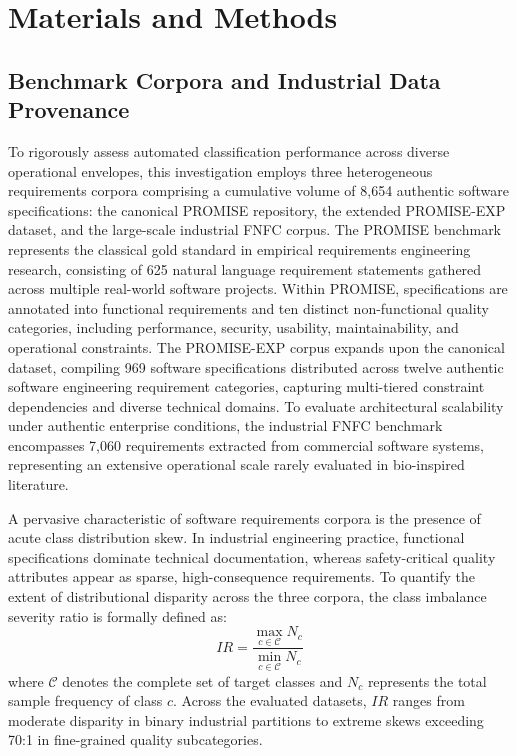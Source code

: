 \section{Materials and Methods}

\subsection{Benchmark Corpora and Industrial Data Provenance}
To rigorously assess automated classification performance across diverse operational envelopes, this investigation employs three heterogeneous requirements corpora comprising a cumulative volume of 8,654 authentic software specifications: the canonical PROMISE repository, the extended PROMISE-EXP dataset, and the large-scale industrial FNFC corpus. The PROMISE benchmark represents the classical gold standard in empirical requirements engineering research, consisting of 625 natural language requirement statements gathered across multiple real-world software projects. Within PROMISE, specifications are annotated into functional requirements and ten distinct non-functional quality categories, including performance, security, usability, maintainability, and operational constraints. The PROMISE-EXP corpus expands upon the canonical dataset, compiling 969 software specifications distributed across twelve authentic software engineering requirement categories, capturing multi-tiered constraint dependencies and diverse technical domains. To evaluate architectural scalability under authentic enterprise conditions, the industrial FNFC benchmark encompasses 7,060 requirements extracted from commercial software systems, representing an extensive operational scale rarely evaluated in bio-inspired literature.

A pervasive characteristic of software requirements corpora is the presence of acute class distribution skew. In industrial engineering practice, functional specifications dominate technical documentation, whereas safety-critical quality attributes appear as sparse, high-consequence requirements. To quantify the extent of distributional disparity across the three corpora, the class imbalance severity ratio is formally defined as:
\begin{equation}
IR = \frac{\max_{c \in \mathcal{C}} N_c}{\min_{c \in \mathcal{C}} N_c}
\end{equation}
where $\mathcal{C}$ denotes the complete set of target classes and $N_c$ represents the total sample frequency of class $c$. Across the evaluated datasets, $IR$ ranges from moderate disparity in binary industrial partitions to extreme skews exceeding 70:1 in fine-grained quality subcategories.

